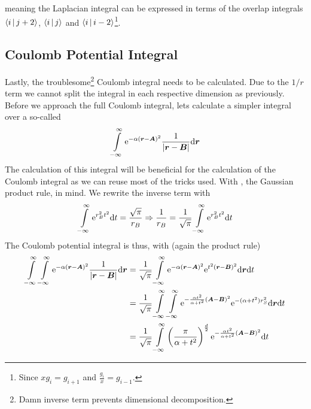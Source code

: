     meaning the Laplacian integral can be expressed in terms of the overlap
    integrals $\Braket{i|j+2}$, $\Braket{i|j}$ and
    $\Braket{i|i-2}$\footnote{Since $xg_i=g_{i+1}$ and
    $\frac{g_i}{x}=g_{i-1}$.}.

\subsection{Coulomb Potential Integral}
    Lastly, the troublesome\footnote{Damn inverse term prevents dimensional
    decomposition.} Coulomb integral needs to be calculated. Due to the $1/r$
    term we cannot split the integral in each respective dimension as
    previously. Before we approach the full Coulomb integral, lets calculate a
    simpler integral over a so-called 
        \begin{equation}
            \int\limits^{\infty}_{-\infty} \mathrm{e}^{-\alpha\left(\boldsymbol{{r}} - \boldsymbol{{A}}\right)^2}
            \frac{1}{\abs{\boldsymbol{{r}} - \boldsymbol{{B}}}} \mathrm{d}\boldsymbol{{r}}
        \end{equation}
    The calculation of this integral will be beneficial for the calculation of
    the Coulomb integral as we can reuse most of the tricks used. With
    , the Gaussian product rule, in mind. We
    rewrite the inverse term with
        \begin{equation}
            \int\limits^{\infty}_{-\infty} \mathrm{e}^{r^2_B t^2} \mathrm{d} t = \frac{\sqrt{\pi}}{r_B} \Rightarrow
            \frac{1}{r_B} = \frac{1}{\sqrt{\pi}} \int\limits^{\infty}_{-\infty} \mathrm{e}^{r^2_Bt^2} \mathrm{d} t
            \label{eq:onelectronTrick1}
        \end{equation}
    The Coulomb potential integral is thus, with
    (again the product rule)
        \begin{align}
            \int\limits^{\infty}_{-\infty}\int\limits^{\infty}_{-\infty} \mathrm{e}^{-\alpha\left(\boldsymbol{{r}} - \boldsymbol{{A}}\right)^2}
            \frac{1}{\abs{\boldsymbol{{r}} - \boldsymbol{{B}}}} \mathrm{d}\boldsymbol{{r}} &=
            \frac{1}{\sqrt{\pi}}\int\limits^{\infty}_{-\infty} \mathrm{e}^{-\alpha\left(\boldsymbol{{r}} -
            \boldsymbol{{A}}\right)^2} \mathrm{e}^{t^2(\boldsymbol{{r}} - \boldsymbol{{B}})^2} \mathrm{d}\boldsymbol{{r}} \mathrm{d}
            t \nonumber \\
            &= \frac{1}{\sqrt{\pi}} \int\limits^{\infty}_{-\infty}\int\limits^{\infty}_{-\infty} \mathrm{e}^{-\frac{\alpha
            t^2}{\alpha + t^2}\left(\boldsymbol{{A}} - \boldsymbol{{B}}\right)^2}
            \mathrm{e}^{-(\alpha+t^2)r^2_S} \mathrm{d}\boldsymbol{{r}} \mathrm{d} t \nonumber \\
            &= \frac{1}{\sqrt{\pi}} \int\limits^{\infty}_{-\infty} \left(\frac{\pi}{\alpha +
            t^2}\right)^{\frac{d}{2}} \mathrm{e}^{-\frac{\alpha t^2}{\alpha +
            t^2}\left(\boldsymbol{{A}} - \boldsymbol{{B}}\right)^2} \mathrm{d} t
            \label{eq:coulombPotentialIntegral}
        \end{align}
